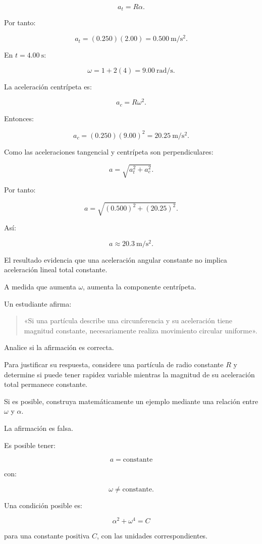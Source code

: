 \begin{explicacion}
\[
a_t=R\alpha.
\]

Por tanto:

\[
a_t=(0.250)(2.00)
=\boxed{\SI{0.500}{\meter\per\second\squared}}.
\]

En \(t=\SI{4.00}{\second}\):

\[
\omega=1+2(4)=\SI{9.00}{\radian\per\second}.
\]

La aceleración centrípeta es:

\[
a_c=R\omega^2.
\]

Entonces:

\[
a_c=(0.250)(9.00)^2
=\boxed{\SI{20.25}{\meter\per\second\squared}}.
\]

Como las aceleraciones tangencial y centrípeta son
perpendiculares:

\[
a=\sqrt{a_t^2+a_c^2}.
\]

Por tanto:

\[
a=\sqrt{(0.500)^2+(20.25)^2}.
\]

Así:

\[
\boxed{a\approx\SI{20.3}{\meter\per\second\squared}}.
\]

El resultado evidencia que una aceleración angular constante
no implica aceleración lineal total constante.

A medida que aumenta \(\omega\), aumenta la componente
centrípeta.
\end{explicacion}


\begin{ejercicio}
Un estudiante afirma:

\begin{quote}
«Si una partícula describe una circunferencia y su aceleración
tiene magnitud constante, necesariamente realiza movimiento
circular uniforme».
\end{quote}

Analice si la afirmación es correcta.

Para justificar su respuesta, considere una partícula de radio
constante \(R\) y determine si puede tener rapidez variable
mientras la magnitud de su aceleración total permanece constante.

Si es posible, construya matemáticamente un ejemplo mediante
una relación entre \(\omega\) y \(\alpha\).
\end{ejercicio}

\begin{respuesta}
La afirmación es falsa.

Es posible tener:

\[
\boxed{a=\text{constante}}
\]

con:

\[
\boxed{\omega\neq\text{constante}}.
\]

Una condición posible es:

\[
\boxed{
\alpha^2+\omega^4=C
}
\]

para una constante positiva \(C\), con las unidades
correspondientes.
\end{respuesta}

